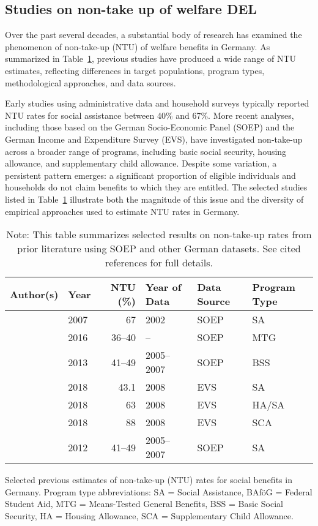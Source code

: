 \subsection{Studies on non-take up of welfare DEL}

Over the past several decades, a substantial body of research has examined the phenomenon of non-take-up (NTU) of welfare benefits in Germany. 
As summarized in Table~\ref{table:NTU-studies}, previous studies have produced a wide range of NTU estimates, reflecting differences in target populations, program types, methodological approaches, and data sources. 

Early studies using administrative data and household surveys typically reported NTU rates for social assistance between 40\% and 67\%. 
More recent analyses, including those based on the German Socio-Economic Panel (SOEP) and the German Income and Expenditure Survey (EVS), have investigated non-take-up across a broader range of programs, including basic social security, housing allowance, and supplementary child allowance. 
Despite some variation, a persistent pattern emerges: a significant proportion of eligible individuals and households do not claim benefits to which they are entitled. 
The selected studies listed in Table~\ref{table:NTU-studies} illustrate both the magnitude of this issue and the diversity of empirical approaches used to estimate NTU rates in Germany.

\begin{table}[htbp]
\centering
\begin{tabular}{llrlll}
\toprule
\textbf{Author(s)} & \textbf{Year} & \textbf{NTU (\%)} & \textbf{Year of Data} & \textbf{Data Source} & \textbf{Program Type} \\
\midrule
\citeauthor{frick_claim_2007} & 2007 & 67 & 2002 & SOEP & SA \\
\citeauthor{herber_non-take-up_2019} & 2016 & 36--40 & -- & SOEP & MTG \\
\citeauthor{RePEc:iab:iabfob:201305} & 2013 & 41--49 & 2005--2007 & SOEP & BSS \\
\citeauthor{bruckmeier_benefit_2018} & 2018 & 43.1 & 2008 & EVS & SA \\
\citeauthor{bruckmeier_benefit_2018} & 2018 & 63 & 2008 & EVS & HA/SA \\
\citeauthor{bruckmeier_benefit_2018} & 2018 & 88 & 2008 & EVS & SCA \\
\citeauthor{bruckmeier_new_2012}  & 2012 & 41--49 & 2005--2007 & SOEP & SA \\
\bottomrule
\end{tabular}
\caption{Selected previous estimates of non-take-up (NTU) rates for social benefits in Germany. Program type abbreviations: SA = Social Assistance, BAföG = Federal Student Aid, MTG = Means-Tested General Benefits, BSS = Basic Social Security, HA = Housing Allowance, SCA = Supplementary Child Allowance.}
\caption*{\small{Note: This table summarizes selected results on non-take-up rates from prior literature using SOEP and other German datasets. See cited references for full details.}}
\label{table:NTU-studies}
\end{table}

